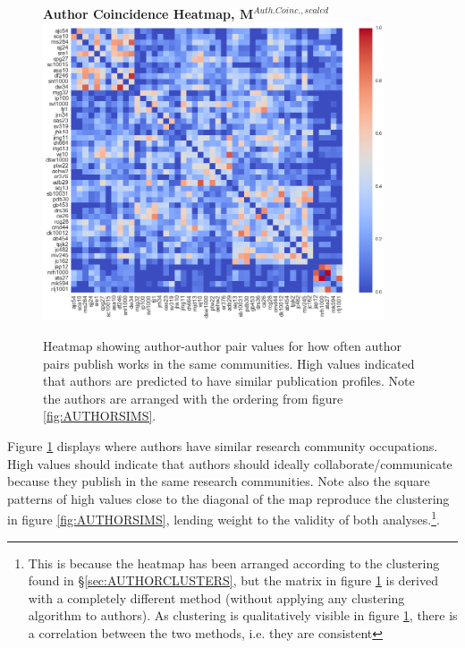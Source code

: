 \begin{center}
\begin{figure}[H]
  \centering
  \textbf{Author Coincidence Heatmap, $\mathbf{M}^{Auth. Coinc.,scaled}$}
    \includegraphics[width=0.9\textwidth]{Analysis/author_comm_heatmap.png}
    \caption[Author Coincidence Matrix Heatmap]{Heatmap showing author-author pair values for how often author pairs publish works in the same communities. High values indicated that authors are predicted to have similar publication profiles. Note the authors are arranged with the ordering from figure \ref{fig:AUTHORSIMS}.}
    \label{fig:commHEATMAP}
\end{figure} 
\end{center}
Figure \ref{fig:commHEATMAP} displays where authors have similar research community occupations. High values should indicate that authors should ideally collaborate/communicate because they publish in the same research communities. Note also the square patterns of high values close to the diagonal of the map reproduce the clustering in figure \ref{fig:AUTHORSIMS}, lending weight to the validity of both analyses.\footnote{This is because the heatmap has been arranged according to the clustering found in \S\ref{sec:AUTHORCLUSTERS}, but the matrix in figure \ref{fig:commHEATMAP} is derived with a completely different method (without applying any clustering algorithm to authors). As clustering is qualitatively visible in figure \ref{fig:commHEATMAP}, there is a correlation between the two methods, i.e. they are consistent}.

